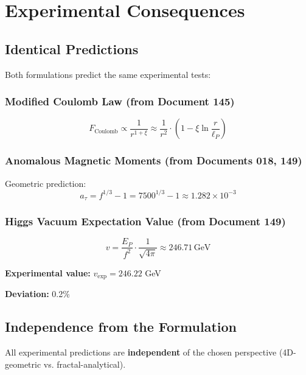 {	\section{Experimental Consequences}
	
	\subsection{Identical Predictions}
	
	Both formulations predict the same experimental tests:
	
	\subsubsection{Modified Coulomb Law (from Document 145)}
	
	\begin{equation}
		F_{\text{Coulomb}} \propto \frac{1}{r^{1+\xi}} \approx \frac{1}{r^{2}} \cdot \left(1 - \xi \ln\frac{r}{\ell_P}\right)
	\end{equation}
	
	\subsubsection{Anomalous Magnetic Moments (from Documents 018, 149)}
	
	Geometric prediction:
	\begin{equation}
		a_\tau = f^{1/3} - 1 = 7500^{1/3} - 1 \approx 1.282 \times 10^{-3}
	\end{equation}
	
	\subsubsection{Higgs Vacuum Expectation Value (from Document 149)}
	
	\begin{equation}
		v = \frac{E_P}{f^2} \cdot \frac{1}{\sqrt{4\pi}} \approx 246.71\,\text{GeV}
	\end{equation}
	
	\textbf{Experimental value:} $v_{\exp} = 246.22$ GeV
	
	\textbf{Deviation:} 0.2\%
	
	\subsection{Independence from the Formulation}
	
	\begin{important}
		All experimental predictions are \textbf{independent} of the chosen perspective (4D-geometric vs. fractal-analytical).
		

\end{important}}
